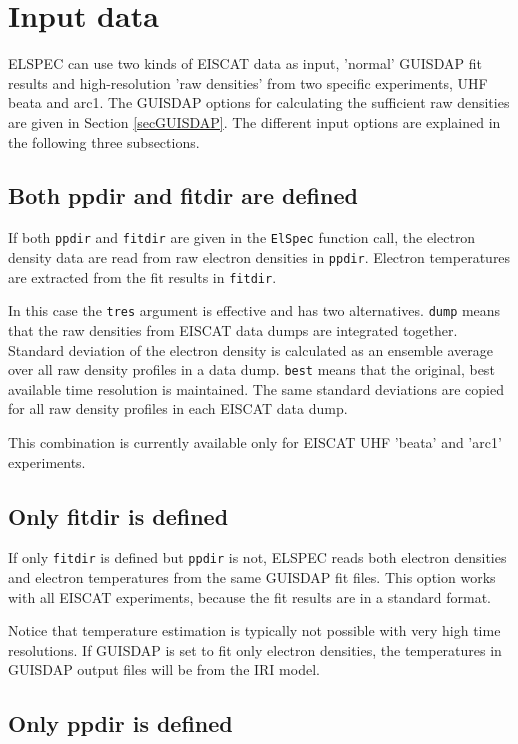 \documentclass[12pt,a4paper]{report}
\begin{document}
\section{Input data}

ELSPEC can use two kinds of EISCAT data as input, 'normal' GUISDAP fit results and high-resolution 'raw densities' from two specific experiments, UHF beata and arc1.  The GUISDAP options for calculating the sufficient raw densities are given in Section \ref{secGUISDAP}. The different input options are explained in the following three subsections. 

\subsection{Both ppdir and fitdir are defined}

If both \verb|ppdir| and \verb|fitdir| are given in the \verb|ElSpec| function call, the electron density data are read from raw electron densities in \verb|ppdir|. Electron temperatures are extracted from the fit results in  \verb|fitdir|. 

In this case the \verb|tres| argument is effective and has two alternatives. \verb|dump| means that the raw densities from EISCAT data dumps are integrated together. Standard deviation of the electron density is calculated as an ensemble average over all raw density profiles in a data dump. \verb|best| means that the original, best available time resolution is maintained. The same standard deviations are copied for all raw density profiles in each EISCAT data dump. 

This combination is currently available only for EISCAT UHF 'beata' and 'arc1' experiments. 

\subsection{Only fitdir is defined}

If only \verb|fitdir| is defined but \verb|ppdir| is not, ELSPEC reads both electron densities and electron temperatures from the same GUISDAP fit files. This option works with all EISCAT experiments, because the fit results are in a standard format. 

Notice that temperature estimation is typically not possible with very high time resolutions. If GUISDAP is set to fit only electron densities, the temperatures in GUISDAP output files will be from the IRI model. 


\subsection{Only ppdir is defined}
\end{document}
